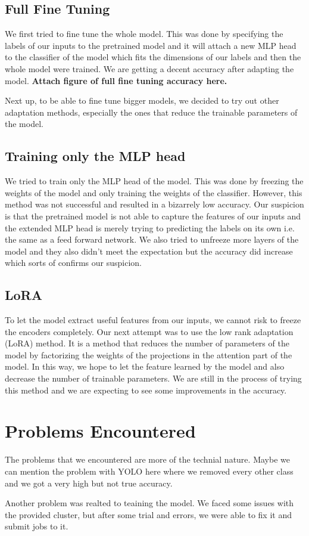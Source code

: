 \documentclass[10pt,twocolumn,letterpaper]{article}
\begin{document}
\subsection{Full Fine Tuning}
We first tried to fine tune the whole model. This was done by specifying the labels of our inputs to the pretrained model and it will attach a new MLP head to the classifier of the model which fits the dimensions of our labels and then the whole model were trained. We are getting a decent accuracy after adapting the model. \textbf{Attach figure of full fine tuning accuracy here.}

Next up, to be able to fine tune bigger models, we decided to try out other adaptation methods, especially the ones that reduce the trainable parameters of the model.

\subsection{Training only the MLP head}
We tried to train only the MLP head of the model. This was done by freezing the weights of the model and only training the weights of the classifier. However, this method was not successful and resulted in a bizarrely low accuracy. Our suspicion is that the pretrained model is not able to capture the features of our inputs and the extended MLP head is merely trying to predicting the labels on its own i.e. the same as a feed forward network.
We also tried to unfreeze more layers of the model and they also didn't meet the expectation but the accuracy did increase which sorts of confirms our suspicion.
\subsection{LoRA}
To let the model extract useful features from our inputs, we cannot risk to freeze the encoders completely. Our next attempt was to use the low rank adaptation (LoRA) method. It is a method that reduces the number of parameters of the model by factorizing the weights of the projections in the attention part of the model. In this way, we hope to let the feature learned by the model and also decrease the number of trainable parameters. We are still in the process of trying this method and we are expecting to see some improvements in the accuracy.
\section{Problems Encountered}
The problems that we encountered are more of the technial nature. Maybe we can mention the problem with YOLO here where we removed every other class and we got a very high but not true accuracy. 

Another problem was realted to teaining the model. We faced some issues with the provided cluster, but after some trial and errors, we were able to fix it and submit jobs to it. 


{\small


}
\end{document}
